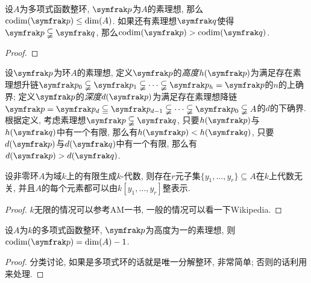 \begin{proposition}\label{prop:primeidealdim}
  设$A$为多项式函数整环, $\ideal{p}$为$A$的素理想, 那么$\codim (\ideal{p})\leq\dim (A)$. 如果还有素理想$\ideal{q}$使得$\ideal{p}\subsetneqq\ideal{q}$, 那么$\codim (\ideal{p})>\codim (\ideal{q})$.
\end{proposition}

\begin{proof}
\end{proof}

设$\ideal{p}$为环$A$的素理想,  定义$\ideal{p}$的\emph{高度}$h(\ideal{p})$为满足存在素理想升链$\ideal{p}_0\subsetneqq\ideal{p}_1\subsetneqq\dotsb\subsetneqq \ideal{p}_h=\ideal{p}$的$n$的上确界; 定义$\ideal{p}$的\emph{深度}$d(\ideal{p})$为满足存在素理想降链$\ideal{p}=\ideal{p}_d\subseteqq\ideal{p}_{d-1}\subsetneqq\dotsb\subsetneqq\ideal{p}_0\subsetneqq A$的$d$的下确界. 根据定义, 考虑素理想$\ideal{p}\subsetneqq\ideal{q}$, 只要$h(\ideal{p})$与$h(\ideal{q})$中有一个有限, 那么有$h(\ideal{p})<h(\ideal{q})$, 只要$d(\ideal{p})$与$d(\ideal{q})$中有一个有限, 那么有$d(\ideal{p})>d(\ideal{q})$.

\begin{proposition}\label{prop:noethernormalization}
  设非零环$A$为域$k$上的有限生成$k$-代数, 则存在$r$元子集$\{y_1, \dotsc, y_r\}\subseteq A$在$k$上代数无关, 并且$A$的每个元素都可以由$k[y_1, \dotsc, y_r]$整表示.%
\end{proposition}

\begin{proof}
  $k$无限的情况可以参考AM一书, 一般的情况可以看一下Wikipedia.
\end{proof}

\begin{proposition}\label{prop:heightoneideallemma}
  设$A$为$k$的多项式函数整环, $\ideal{p}$为高度为一的素理想, 则$\codim (\ideal{p}) = \dim (A)-1$.
\end{proposition}

\begin{proof}
  分类讨论, 如果是多项式环的话就是唯一分解整环, 非常简单; 否则的话利用来处理.
\end{proof}

